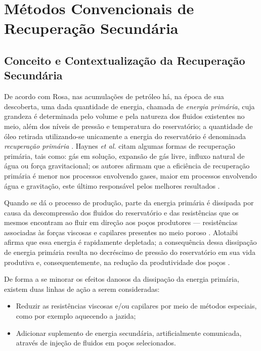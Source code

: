 
\section{M\'{e}todos Convencionais de Recupera\c{c}\~{a}o Secund\'{a}ria}

\subsection{Conceito e Contextualiza\c{c}\~{a}o da Recupera\c{c}\~{a}o Secund\'{a}ria}

De acordo com Rosa, nas acumula\c{c}\~{o}es de petr\'{o}leo h\'{a}, na \'{e}poca de sua descoberta, uma dada quantidade de energia, chamada de \textit{energia prim\'{a}ria}, cuja grandeza \'{e} determinada pelo volume e pela natureza dos fluidos existentes no meio, al\'{e}m dos n\'{i}veis de press\~{a}o e temperatura do reservat\'{o}rio; a quantidade de \'{o}leo retirada utilizando-se unicamente a energia do reservat\'{o}rio \'{e} denominada \textit{recupera\c{c}\~{a}o prim\'{a}ria} \cite{engres}. Haynes \textit{et al.} citam algumas formas de recupera\c{c}\~{a}o prim\'{a}ria, tais como: g\'{a}s em solu\c{c}\~{a}o, expans\~{a}o de g\'{a}s livre, influxo natural de \'{a}gua ou for\c{c}a gravitacional; os autores afirmam que a efici\^{e}ncia de recupera\c{c}\~{a}o prim\'{a}ria \'{e} menor nos processos envolvendo gases, maior em processos envolvendo \'{a}gua e gravita\c{c}\~{a}o, este \'{u}ltimo respons\'{a}vel pelos melhores resultados \cite{oil1976}.

Quando se d\'{a} o processo de produ\c{c}\~{a}o, parte da energia prim\'{a}ria \'{e} dissipada por causa da descompress\~{a}o dos fluidos do reservat\'{o}rio e das resist\^{e}ncias que os mesmos encontram ao fluir em dire\c{c}\~{a}o aos po\c{c}os produtores --- resist\^{e}ncias associadas \`{a}s for\c{c}as viscosas e capilares presentes no meio poroso \cite{engres}. Alotaibi afirma que essa energia \'{e} rapidamente depletada; a consequ\^{e}ncia dessa dissipa\c{c}\~{a}o de energia prim\'{a}ria resulta no decr\'{e}scimo de press\~{a}o do reservat\'{o}rio em sua vida produtiva e, consequentemente, na redu\c{c}\~{a}o da produtividade dos po\c{c}os \cite{alotaibi}. 

De forma a se minorar os efeitos danosos da dissipa\c{c}\~{a}o da energia prim\'{a}ria, existem duas linhas de a\c{c}\~{a}o a serem consideradas:

\begin{itemize}
\item Reduzir as resist\^{e}ncias viscosas e/ou capilares por meio de m\'{e}todos especiais, como por exemplo aquecendo a jazida;
\item Adicionar suplemento de energia secund\'{a}ria, artificialmente comunicada, atrav\'{e}s de inje\c{c}\~{a}o de fluidos em po\c{c}os selecionados.
\end{itemize}

